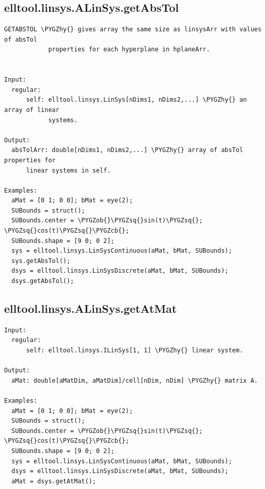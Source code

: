 \documentclass[letterpaper,10pt,english]{sphinxmanual}
\def\PYGZob{\char`\{}
\def\PYGZcb{\char`\}}
\def\PYGZhy{\char`\-}
\def\PYGZsq{\char`\'}
\begin{document}
\subsection{elltool.linsys.ALinSys.getAbsTol}
\label{chap_functions:elltool-linsys-alinsys-getabstol}
\begin{Verbatim}[commandchars=\\\{\}]
GETABSTOL \PYGZhy{} gives array the same size as linsysArr with values of absTol
            properties for each hyperplane in hplaneArr.


Input:
  regular:
      self: elltool.linsys.LinSys[nDims1, nDims2,...] \PYGZhy{} an array of linear
            systems.

Output:
  absTolArr: double[nDims1, nDims2,...] \PYGZhy{} array of absTol properties for
      linear systems in self.

Examples:
  aMat = [0 1; 0 0]; bMat = eye(2);
  SUBounds = struct();
  SUBounds.center = \PYGZob{}\PYGZsq{}sin(t)\PYGZsq{}; \PYGZsq{}cos(t)\PYGZsq{}\PYGZcb{};
  SUBounds.shape = [9 0; 0 2];
  sys = elltool.linsys.LinSysContinuous(aMat, bMat, SUBounds);
  sys.getAbsTol();
  dsys = elltool.linsys.LinSysDiscrete(aMat, bMat, SUBounds);
  dsys.getAbsTol();
\end{Verbatim}


\subsection{elltool.linsys.ALinSys.getAtMat}
\label{chap_functions:elltool-linsys-alinsys-getatmat}
\begin{Verbatim}[commandchars=\\\{\}]
Input:
  regular:
      self: elltool.linsys.ILinSys[1, 1] \PYGZhy{} linear system.

Output:
  aMat: double[aMatDim, aMatDim]/cell[nDim, nDim] \PYGZhy{} matrix A.

Examples:
  aMat = [0 1; 0 0]; bMat = eye(2);
  SUBounds = struct();
  SUBounds.center = \PYGZob{}\PYGZsq{}sin(t)\PYGZsq{}; \PYGZsq{}cos(t)\PYGZsq{}\PYGZcb{};
  SUBounds.shape = [9 0; 0 2];
  sys = elltool.linsys.LinSysContinuous(aMat, bMat, SUBounds);
  dsys = elltool.linsys.LinSysDiscrete(aMat, bMat, SUBounds);
  aMat = dsys.getAtMat();
\end{Verbatim}
\end{document}
